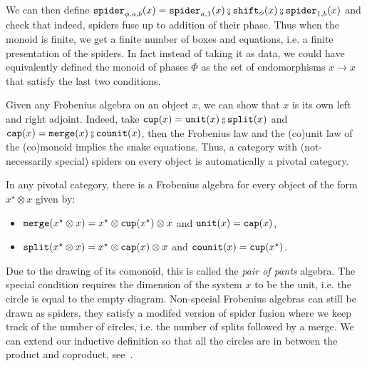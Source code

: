 We can then define $\spider_{\phi, a, b}(x) = \spider_{a, 1}(x) \fcmp \shift_\phi(x) \fcmp \spider_{1, b}(x)$ and check that indeed, spiders fuse up to addition of their phase.
Thus when the monoid is finite, we get a finite number of boxes and equations, i.e. a finite presentation of the spiders.
In fact instead of taking it as data, we could have equivalently defined the monoid of phases $\Phi$ as the set of endomorphisms $x \to x$ that satisfy the last two conditions.

\begin{remark}
Given any Frobenius algebra on an object $x$, we can show that $x$ is its own left and right adjoint.
Indeed, take $\ttcup(x) = \unit(x) \fcmp \ttsplit(x)$ and $\ttcap(x) = \merge(x) \fcmp \counit(x)$, then the Frobenius law and the (co)unit law of the (co)monoid implies the snake equations.
Thus, a category with (not-necessarily special) spiders on every object is automatically a pivotal category.

\end{remark}

\begin{example}
In any pivotal category, there is a Frobenius algebra for every object of the form $x^\star \otimes x$ given by:
\begin{itemize}
\item $\mathtt{merge}(x^\star \otimes x) = x^\star \otimes \mathtt{cup}(x^\star) \otimes x$ and $\mathtt{unit}(x) = \mathtt{cap}(x)$,
\item $\mathtt{split}(x^\star \otimes x) = x^\star \otimes \mathtt{cap}(x) \otimes x$ and $\mathtt{counit}(x) = \mathtt{cup}(x^\star)$.
\end{itemize}
Due to the drawing of its comonoid, this is called the \emph{pair of pants} algebra.
The special condition requires the dimension of the system $x$ to be the unit, i.e. the circle is equal to the empty diagram.
Non-special Frobenius algebras can still be drawn as spiders, they satisfy a modifed version of spider fusion where we keep track of the number of circles, i.e. the number of splits followed by a merge.
We can extend our inductive definition so that all the circles are in between the product and coproduct, see~\cite[Theorem 5.21]{HeunenVicary19a}.
\end{example}

